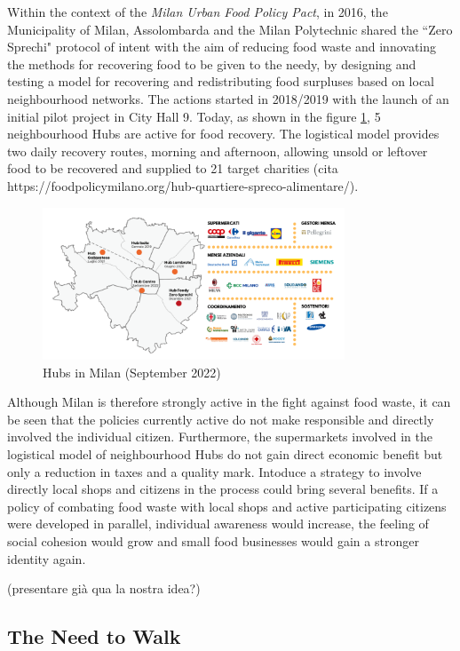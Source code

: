 Within the context of the \textit{Milan Urban Food Policy Pact}, in 2016, the Municipality of Milan, Assolombarda and the Milan Polytechnic shared the ``Zero Sprechi" protocol of intent with the aim of reducing food waste and innovating the methods for recovering food to be given to the needy, by designing and testing a model for recovering and redistributing food surpluses based on local neighbourhood networks. The actions started in 2018/2019 with the launch of an initial pilot project in City Hall 9. Today, as shown in the figure \ref{fig: hubs}, 5 neighbourhood Hubs are active for food recovery. The logistical model provides two daily recovery routes, morning and afternoon, allowing unsold or leftover food to be recovered and supplied to 21 target charities  (cita https://foodpolicymilano.org/hub-quartiere-spreco-alimentare/). 

\begin{figure}[h!]
  \centering
  \includegraphics[width=9cm]{figs/hubs.png}
  \caption{Hubs in Milan (September 2022)}
  \label{fig: hubs}
\end{figure}

Although Milan is therefore strongly active in the fight against food waste, it can be seen that the policies currently active do not make responsible and directly involved the individual citizen. Furthermore, the supermarkets involved in the logistical model of neighbourhood Hubs do not gain direct economic benefit but only a reduction in taxes and a quality mark. Intoduce a strategy to involve directly local shops and citizens in the process could bring several benefits. If a policy of combating food waste with local shops and active participating citizens were developed in parallel, individual awareness would increase, the feeling of social cohesion would grow and small food businesses would gain a stronger identity again.

(presentare già qua la nostra idea?)

\subsection{The Need to Walk}

